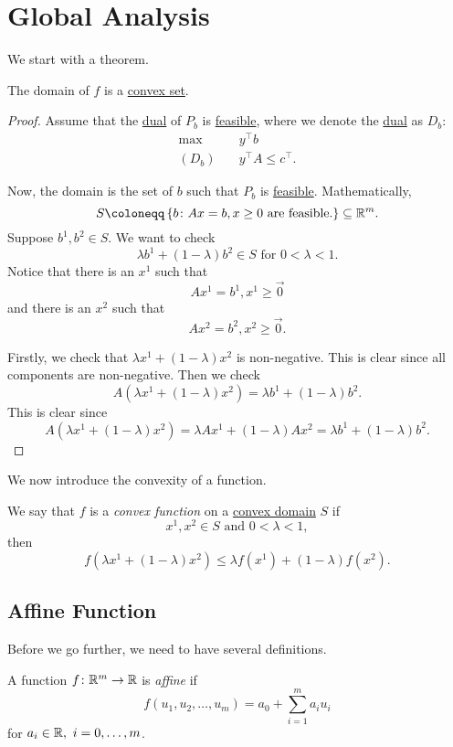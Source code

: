 \section{Global Analysis}
We start with a theorem.
\begin{theorem}\label{thm:lec14-1}
	The domain of \(f\) is a \hyperref[def:convex-set]{convex set}.
\end{theorem}
\begin{proof}
	Assume that the \hyperref[def:dual]{dual} of \(P_b\) is \hyperref[def:feasible-solution]{feasible}, where we denote the \hyperref[def:dual]{dual} as \(D_b\):
	\begin{align*}
		\max~      & y^{\top}b               \\
		(D_b)\quad & y^{\top}A\leq c^{\top}.
	\end{align*}

	Now, the domain is the set of \(b\) such that \(P_b\) is \hyperref[def:feasible-solution]{feasible}. Mathematically,
	\[
		S\coloneqq \left\{ b\colon Ax = b, x\geq 0 \text{ are feasible.}\right\}\subseteq \mathbb{\MakeUppercase{R}}^m.
	\]
	Suppose \(b^1, b^2\in S\). We want to check
	\[
		\lambda b^{1}+(1-\lambda) b^2 \in S\text{ for }0<\lambda<1.
	\]
	Notice that there is an \(x^1\) such that
	\[
		Ax^1 = b^1, x^1\geq \vec{0}
	\]
	and there is an \(x^2\) such that
	\[
		Ax^2 = b^2, x^2\geq \vec{0}.
	\]

	Firstly, we check that \(\lambda x^{1}+(1 - \lambda)x^2\) is non-negative. This is clear since all components are non-negative. Then we check
	\[
		A(\lambda x^{1}+(1 - \lambda)x^2) = \lambda b^1 + (1 - \lambda)b^2.
	\]
	This is clear since
	\[
		A(\lambda x^{1}+(1 - \lambda)x^2) = \lambda Ax^1 + (1 - \lambda)Ax^2 = \lambda b^1 + (1-\lambda)b^2.
	\]
\end{proof}

We now introduce the convexity of a function.
\begin{definition}\label{def:convex-function}
	We say that \(f\) is a \emph{convex function} on a \hyperref[def:convex-set]{convex domain} \(S\) if
	\[
		x^1, x^2\in S\text{ and }0<\lambda<1,
	\]
	then
	\[
		f(\lambda x^1+(1 - \lambda)x^2)\leq \lambda f(x^1)+(1-\lambda)f(x^2).
	\]
	\begin{figure}[H]
		\centering
		\label{fig:convex-function}
	\end{figure}
\end{definition}

\subsection{Affine Function}
Before we go further, we need to have several definitions.
\begin{definition}\label{def:affine-function}
	A function \(f\colon \mathbb{\MakeUppercase{R}}^{m}\to \mathbb{\MakeUppercase{R}}\) is \emph{affine} if
	\[
		f(u_1, u_2, \ldots , u_m) = a_0 + \sum\limits_{i=1}^{m} a_{i}u_{i}
	\]
	for \(a_i \in\mathbb{\MakeUppercase{R}},\ i = 0, \ldots , m\).
\end{definition}


